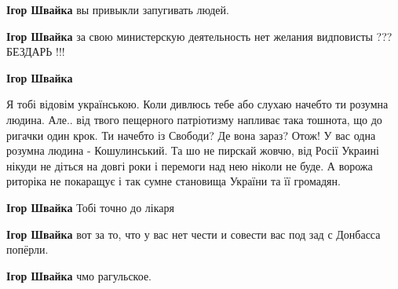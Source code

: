 \begin{itemize}
\begin{itemize}
\textbf{Ігор Швайка} вы привыкли запугивать людей.

 
\textbf{Ігор Швайка} за свою министерскую деятельность нет желания видповисты ??? БЕЗДАРЬ !!!

 
\textbf{Ігор Швайка} 

Я тобі відовім українською. Коли дивлюсь тебе або слухаю
начебто ти розумна людина. Але.. від твого пещерного патріотизму напливає така
тошнота, що до ригачки один крок. Ти начебто із Свободи? Де вона зараз? Отож! У
вас одна розумна людина - Кошулинський. Та шо не пирскай жовчю, від Росії Украині
нікуди не діться на довгі роки і перемоги над нею ніколи не буде. А ворожа
риторіка не покаращує і так сумне становища України та її громадян.


 
\textbf{Ігор Швайка} Тобі точно до лікаря

 
\textbf{Ігор Швайка} вот за то, что у вас нет чести и совести вас под зад с Донбасса попёрли.

 
\textbf{Ігор Швайка} чмо рагульское.

 

\end{itemize}
\end{itemize}
